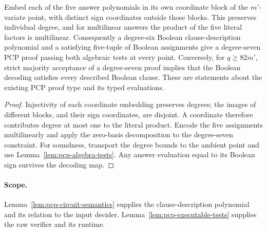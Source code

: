 \begin{lemma}
\label{lem:pcp-proof-algebra}
\leanok
Embed each of the five answer polynomials in its own coordinate block of the
$m'$-variate point, with distinct sign coordinates outside those blocks.
This preserves individual degree, and for multilinear answers the product of
the five literal factors is multilinear. Consequently a degree-six Boolean
clause-description polynomial and a satisfying five-tuple of Boolean assignments
give a degree-seven PCP proof passing both algebraic tests at every point.
Conversely, for $q\geq82m'$, strict majority acceptance of a degree-seven proof
implies that the Boolean decoding satisfies every described Boolean clause.
These are statements about the existing PCP proof type and its typed evaluations.
\end{lemma}
\begin{proof}
\leanok
Injectivity of each coordinate embedding preserves degrees; the images of
different blocks, and their sign coordinates, are disjoint. A coordinate
therefore contributes degree at most one to the literal product. Encode the
five assignments multilinearly and apply the zero-basis decomposition to the
degree-seven constraint. For soundness, transport the degree bounds to the
ambient point and use Lemma~\ref{lem:pcp-algebra-tests}. Any answer evaluation
equal to its Boolean sign survives the decoding map.
\end{proof}
\paragraph{Scope.} Lemma~\ref{lem:pcp-circuit-semantics} supplies the
clause-description polynomial and its relation to the input decider.
Lemma~\ref{lem:pcp-executable-tests} supplies the raw verifier and its runtime.

